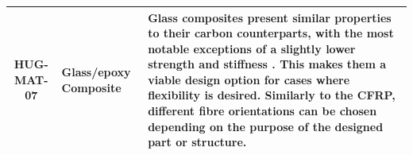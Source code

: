 \begin{longtable}{|c|p{2.25cm}|p{10.75cm}|}
        \\\hline
        HUG-MAT-07 & Glass/epoxy Composite %
        & Glass composites present similar properties to their carbon counterparts, with the most notable exceptions of a slightly lower strength and stiffness \cite{Mouritz2012}. This makes them a viable design option for cases where flexibility is desired. Similarly to the CFRP, different fibre orientations can be chosen depending on the purpose of the designed part or structure.
        \\\hline
        
\end{longtable}

   

